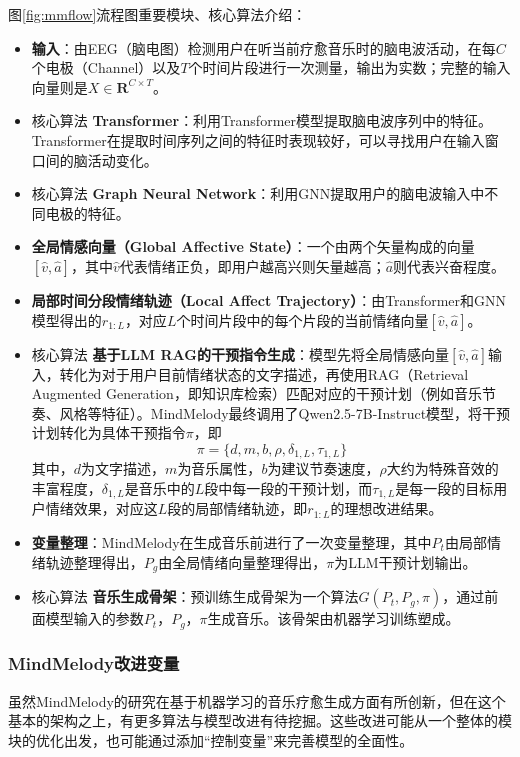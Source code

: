 \documentclass[12pt, fontset=windows]{ctexart}
\begin{document}
图\ref{fig:mmflow}流程图重要模块、核心算法介绍：
\begin{itemize}
\item \textbf{输入}：由EEG（脑电图）检测用户在听当前疗愈音乐时的脑电波活动，在每$C$个电极（Channel）以及$T$个时间片段进行一次测量，输出为实数；完整的输入向量则是$X\in \mathbf{R}^{C\times T}$。
\item \textcolor{AquaBlue}{核心算法}\textbf{ Transformer}：利用Transformer模型提取脑电波序列中的特征。Transformer在提取时间序列之间的特征时表现较好，可以寻找用户在输入窗口间的脑活动变化。
\item \textcolor{AquaBlue}{核心算法}\textbf{ Graph Neural Network}：利用GNN提取用户的脑电波输入中不同电极的特征。
\item \textbf{全局情感向量（Global Affective State）}：一个由两个矢量构成的向量$[\hat{v}, \hat{a}]$，其中$\hat{v}$代表情绪正负，即用户越高兴则矢量越高；$\hat{a}$则代表兴奋程度。
\item \textbf{局部时间分段情绪轨迹（Local Affect Trajectory）}：由Transformer和GNN模型得出的$r_{1:L}$，对应$L$个时间片段中的每个片段的当前情绪向量$[\hat{v}, \hat{a}]$。
\item \textcolor{AquaBlue}{核心算法}\textbf{ 基于LLM RAG的干预指令生成}：模型先将全局情感向量$[\hat{v}, \hat{a}]$输入，转化为对于用户目前情绪状态的文字描述，再使用RAG（Retrieval Augmented Generation，即知识库检索）匹配对应的干预计划（例如音乐节奏、风格等特征）。MindMelody最终调用了Qwen2.5-7B-Instruct模型，将干预计划转化为具体干预指令$\pi$，即\[\pi=\{d, m, b, \rho, \delta_{1, L}, \tau_{1, L}\}\]
其中，$d$为文字描述，$m$为音乐属性，$b$为建议节奏速度，$\rho$大约为特殊音效的丰富程度，$\delta_{1, L}$是音乐中的$L$段中每一段的干预计划，而$\tau_{1, L}$是每一段的目标用户情绪效果，对应这$L$段的局部情绪轨迹，即$r_{1:L}$的理想改进结果。
\item \textbf{变量整理}：MindMelody在生成音乐前进行了一次变量整理，其中$P_t$由局部情绪轨迹整理得出，$P_g$由全局情绪向量整理得出，$\pi$为LLM干预计划输出。
\item \textcolor{AquaBlue}{核心算法}\textbf{ 音乐生成骨架}：预训练生成骨架为一个算法$G(P_t, P_g,\pi)$，通过前面模型输入的参数$P_t$，$P_g$，$\pi$生成音乐。该骨架由机器学习训练塑成。
\end{itemize}

\subsubsection{MindMelody改进变量}

虽然MindMelody的研究在基于机器学习的音乐疗愈生成方面有所创新，但在这个基本的架构之上，有更多算法与模型改进有待挖掘。这些改进可能从一个整体的模块的优化出发，也可能通过添加“控制变量”来完善模型的全面性。
\end{document}
